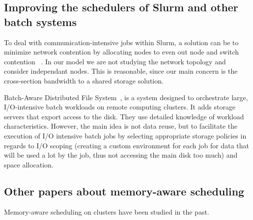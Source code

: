 \documentclass[conference,10pt]{IEEEtran}
\begin{document}
\subsection{Improving the schedulers of Slurm and other batch systems}

To deal with communication-intensive jobs within Slurm, a solution can be to
minimize network contention by allocating nodes to even out node and switch contention
~\cite{minimize_network_contention}. 
In our model we are not studying the network topology and consider independant nodes.
This is reasonable, since our main concern is the cross-section bandwidth to a shared storage solution.

Batch-Aware Distributed File System~\cite{Explicit_Control_in_a_Batch-Aware_Distributed_File_System},
is a system designed to orchestrate large, I/O-intensive batch workloads on remote computing clusters.
It adds storage servers that export access to the disk.
They use detailed knowledge of workload characteristics.
However, the main idea is not data reuse, but to
facilitate the execution of I/O intensive batch
jobs by selecting appropriate storage policies
in regards to I/O scoping (creating a custom environment for each job
for data that will be used a lot by the job, thus not accessing the main disk too
much) and space allocation.


\subsection{Other papers about memory-aware scheduling}
Memory-aware scheduling on clusters have been studied in the past.
 
\end{document}
